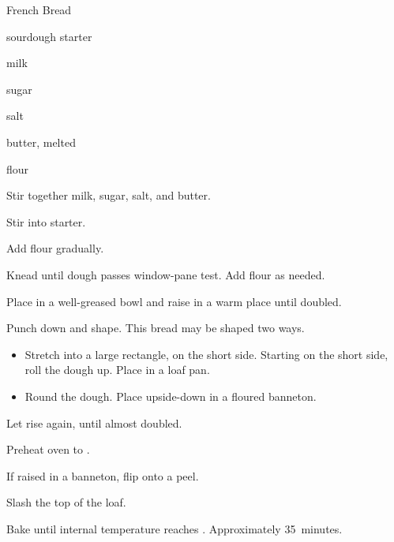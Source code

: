 \begin{recipe}{French Bread}{}{}

\begin{ingredients}
\item {} sourdough starter
\item \C{\half} milk
\item {} sugar
\item {} salt
\item {} butter, melted
\item {} flour
\end{ingredients}

\begin{directions}
\item Stir together milk, sugar, salt, and butter.
\item Stir into starter.
\item Add flour gradually.
\item Knead until dough passes window-pane test. Add flour as needed.
\item Place in a well-greased bowl and raise in a warm place until doubled.
\item Punch down and shape.
This bread may be shaped two ways.
\begin{itemize}
\item Stretch into a large rectangle,  on the short side. Starting on the short side, roll the dough up. Place in a loaf pan.
\item Round the dough. Place upside-down in a floured banneton.
\end{itemize}
\item Let rise again, until almost doubled.
\item Preheat oven to .
\item If raised in a banneton, flip onto a peel.
\item Slash the top of the loaf.
\item Bake until internal temperature reaches . Approximately 35~minutes.
\end{directions}

\end{recipe}
